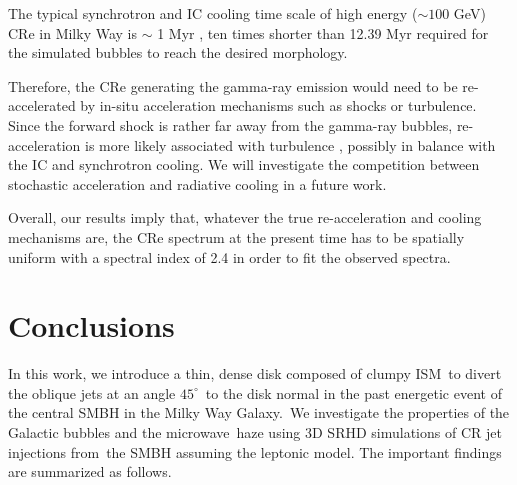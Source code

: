 \documentclass[fleqn,usenatbib,useAMS]{mnras}
\begin{document}
The typical synchrotron and IC cooling time scale of high energy ($\sim100$ GeV) CRe
in Milky Way is $\sim$ 1 Myr \citep{Yang2017}, ten times shorter than
12.39 Myr required for the simulated bubbles to reach the desired morphology.


Therefore, the CRe generating the gamma-ray emission would need to be re-accelerated
by in-situ acceleration mechanisms such as shocks or turbulence.
Since the forward shock is rather far away from the gamma-ray bubbles,
re-acceleration is more likely associated with turbulence \citep{Mertsch2011,Mertsch2019},
possibly in balance with the IC and synchrotron cooling. We will investigate the competition between stochastic acceleration and radiative cooling
in a future work.

Overall, our results imply that, whatever the true re-acceleration and cooling mechanisms are,
the CRe spectrum at the present time has to be spatially uniform with
a spectral index of 2.4 in order to fit the observed spectra.








\section{Conclusions}
\label{Conclusions}
In this work, we introduce a thin, dense disk composed of clumpy ISM\
to divert the oblique jets at an angle $45^{\circ}$\
to the disk normal in the past energetic event of the central SMBH in the Milky Way Galaxy.\
We investigate the properties of the Galactic bubbles and the microwave\
haze using 3D SRHD simulations of CR jet injections from\
the SMBH assuming the leptonic model. The important findings are summarized as follows.
\end{document}
